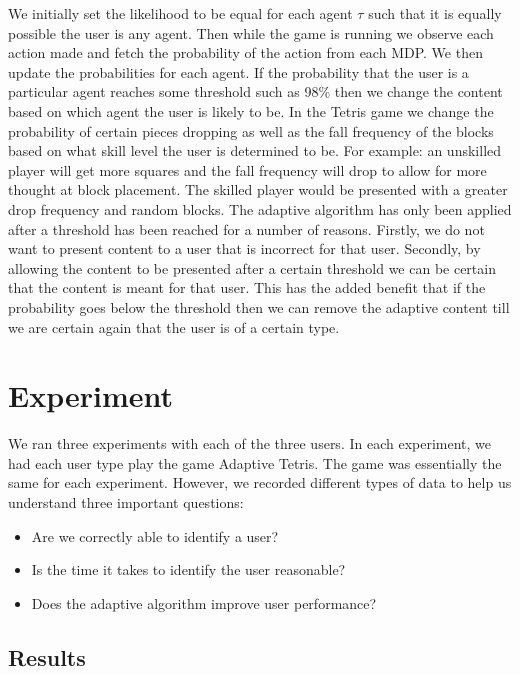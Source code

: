 \documentclass[11pt, conference, compsoc]{IEEEtran}
\begin{document}
We initially set the likelihood to be equal for each agent $\tau $ such that it is equally possible the user is any agent. Then while the game is running we observe each action made and fetch the probability of the action from each MDP. We then update the probabilities for each agent. If the probability that the user is a particular agent reaches some threshold such as 98\% then we change the content based on which agent the user is likely to be. In the Tetris game we change the probability of certain pieces dropping as well as the fall frequency of the blocks based on what skill level the user is determined to be. For example: an unskilled player will get more squares and the fall frequency will drop to allow for more thought at block placement. The skilled player would be presented with a greater drop frequency and random blocks. The adaptive algorithm has only been applied after a threshold has been reached for a number of reasons. Firstly, we do not want to present content to a user that is incorrect for that user. Secondly, by allowing the content to be presented after a certain threshold we can be certain that the content is meant for that user. This has the added benefit that if the probability goes below the threshold then we can remove the adaptive content till we are certain again that the user is of a certain type.

\section{Experiment}

We ran three experiments with each of the three users. In each experiment, we had each user type play the game Adaptive Tetris. The game was essentially the same for each experiment. However, we recorded different types of data to help us understand three important questions: 
\begin{itemize}
\item Are we correctly able to identify a user?
\item Is the time it takes to identify the user reasonable?
\item Does the adaptive algorithm improve user performance?
\end{itemize}

\subsection{    Results}
\end{document}
